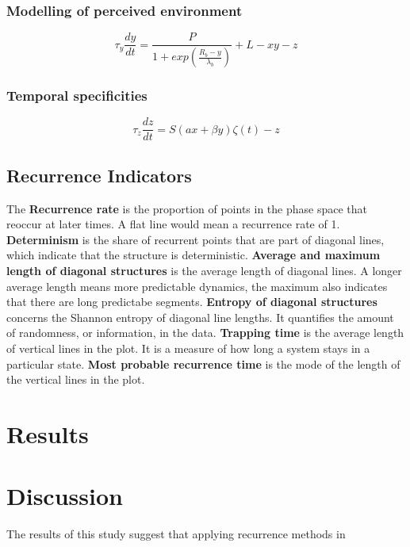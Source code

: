 \documentclass[utf8]{FrontiersinVancouver}
\begin{document}
\subsubsection{Modelling of perceived environment}

\begin{equation}
    \tau_{y}\frac{dy}{dt} = \frac{P}{1+exp(\frac{R_{b}-y}{\lambda_{b}})} + L - xy - z
\end{equation}

\subsubsection{Temporal specificities}

\begin{equation}
    \tau_{z}\frac{dz}{dt} = S(ax + \beta y)\zeta(t) - z
\end{equation}

\subsection{Recurrence Indicators}

The \textbf{Recurrence rate} is the proportion of points in the phase space that reoccur at later times. A flat line would mean a recurrence rate of 1. \textbf{Determinism} is the share of recurrent points that are part of diagonal lines, which indicate that the structure is deterministic.
\textbf{Average and maximum length of diagonal structures} is the average length of diagonal lines. A longer average length means more predictable dynamics, the maximum also indicates that there are long predictabe segments.
\textbf{Entropy of diagonal structures} concerns the Shannon entropy of diagonal line lengths. It quantifies the amount of randomness, or information, in the data. 
\textbf{Trapping time} is the average length of vertical lines in the plot. It is a measure of how long a system stays in a particular state.
\textbf{Most probable recurrence time} is the mode of the length of the vertical lines in the plot.

\section{Results}

\section{Discussion}
The results of this study suggest that applying recurrence methods in 
\end{document}
